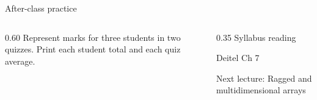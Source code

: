 \documentclass[10pt,aspectratio=169]{beamer}
\begin{document}
\begin{frame}[fragile,t]{After-class practice}
\begin{columns}[T,onlytextwidth]\begin{column}{0.60\textwidth}
Represent marks for three students in two quizzes. Print each student total and each quiz average.
\end{column}\begin{column}{0.35\textwidth}\small
Syllabus reading\par Deitel Ch 7

Next lecture: Ragged and multidimensional arrays
\end{column}\end{columns}
\end{frame}
\end{document}
